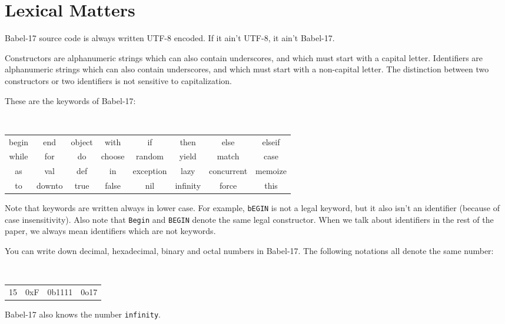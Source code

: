 \documentclass[11pt]{amsart}
\newcommand{\babelsrc}[1] {\lstinline!#1!}
\begin{document}
\section{Lexical Matters}
Babel-17 source code is always written UTF-8 encoded. If it ain't UTF-8, it ain't Babel-17. 

Constructors are alphanumeric strings which can also contain underscores, and which must start with a capital letter. 
Identifiers are alphanumeric strings which can also contain underscores, and which must start with a non-capital letter.
The distinction between two constructors or two identifiers is not sensitive to capitalization.

These are the keywords of Babel-17:
\begin{center}
\tt
\begin{tabular}{cccccccc}
begin & end & object & with & if & then & else & elseif \\
while &  for & do & choose & random & yield & match & case \\
as & val & def & in & exception & lazy & concurrent & memoize \\
to & downto & true & false & nil & infinity &  force & this
\end{tabular}
\end{center}
Note that keywords are written always in lower case. For example, {\tt bEGIN} is not a legal keyword, but it also isn't an identifier (because of case insensitivity). Also note that {\tt Begin} and {\tt BEGIN} denote the same legal constructor. When we talk about identifiers in the rest of the paper, we always mean identifiers which are not keywords.

You can write down decimal, hexadecimal, binary and octal numbers in Babel-17. The following notations all denote the same number:
\begin{center}
\tt
\begin{tabular}{cccc}
15 & 0xF & 0b1111 &  0o17
\end{tabular}
\end{center}
Babel-17 also knows the number \babelsrc{infinity}.
\end{document}

